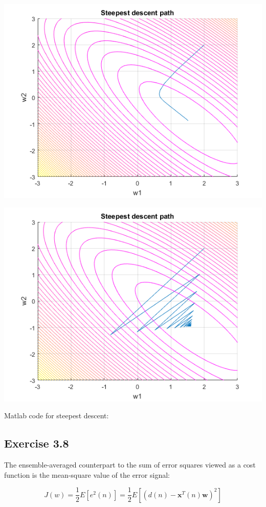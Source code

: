 \documentclass[a4paper, 12pt]{article}
\begin{document}
\includegraphics[scale = 1]{d1.png}

\includegraphics[scale = 1]{d2.png}

\newpage

Matlab code for steepest descent:
\medskip


\subsection{Exercise 3.8}
The ensemble-averaged counterpart to the sum of error squares viewed as a cost function is the mean-square value
of the error signal:

\begin{equation*}
J(w) = \frac{1}{2}E[e^2(n)] = \frac{1}{2}E[(d(n) - \mathbf{x}^T(n)\mathbf{w})^2]
\end{equation*}
\end{document}
